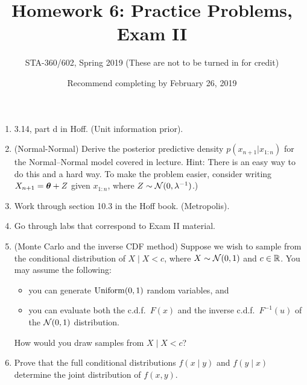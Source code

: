 \documentclass{article}
\begin{document}
\title{Homework 6: Practice Problems, Exam II}
\author{STA-360/602, Spring 2019 (These are not to be turned in for credit)}
\date{Recommend completing by February 26, 2019}
\maketitle




\begin{enumerate}
\item 3.14, part d in Hoff. (Unit information prior). 
\item (Normal-Normal)  Derive the posterior predictive density $p(x_{n +1}|x_{1:n})$ for the Normal--Normal model covered in lecture. Hint: There is an easy way to do this and a hard way. To make the problem easier, consider writing $X_{n+1} = {\bm\theta} + Z$ given $x_{1:n}$, where $Z\sim\mathcal{N}(0,\lambda^{-1})$.)
\item Work through section 10.3 in the Hoff book. (Metropolis). 
\item Go through labs that correspond to Exam II material. 
\item (Monte Carlo and the inverse CDF method) 
Suppose we wish to sample from the conditional distribution of $X\mid X<c$, where $X\sim\mathcal{N}(0,1)$ and $c\in \mathbb{R}$. You may assume the following:
\begin{itemize}
    \item you can generate $\operatorname*{Uniform}(0,1)$ random variables, and 
    \item you can evaluate both the c.d.f.\ $F(x)$ and the inverse c.d.f.\ $F^{-1}(u)$ of the $\mathcal{N}(0,1)$ distribution.
\end{itemize}
How would you draw samples from $X\mid X<c$?
\item Prove that the full conditional distributions $f(x \mid y)$ and $f(y \mid x)$ determine the joint distribution of $f(x,y).$
\end{enumerate}
\end{document}
